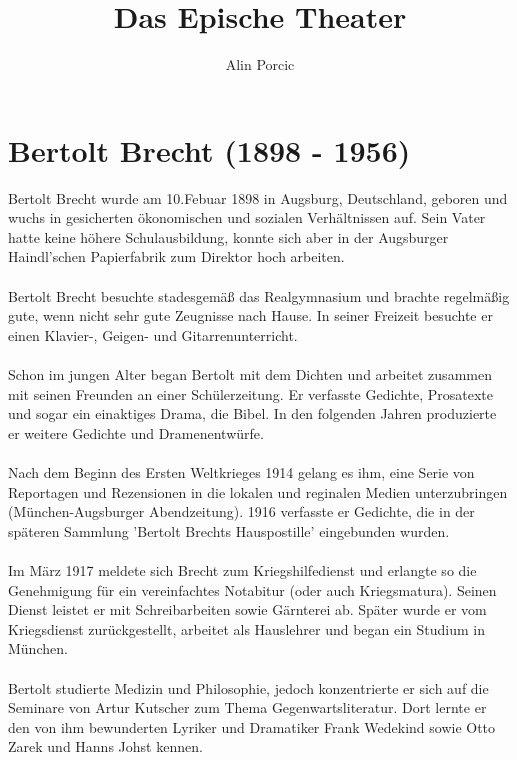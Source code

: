 \documentclass[a4paper]{article}
\title{Das Epische Theater}
\author{Alin Porcic}
\begin{document}
	\maketitle
	\newpage

        \section{Bertolt Brecht (1898 - 1956)}

	Bertolt Brecht wurde am 10.Febuar 1898 in Augsburg, Deutschland, geboren und wuchs in gesicherten ökonomischen und sozialen Verhältnissen auf. Sein Vater hatte keine höhere Schulausbildung, konnte sich aber in der Augsburger Haindl'schen Papierfabrik zum Direktor hoch arbeiten.\\\\
        Bertolt Brecht besuchte stadesgemäß das Realgymnasium und brachte regelmäßig gute, wenn nicht sehr gute Zeugnisse nach Hause. In seiner Freizeit besuchte er einen Klavier-, Geigen- und Gitarrenunterricht.\\\\
        Schon im jungen Alter began Bertolt mit dem Dichten und arbeitet zusammen mit seinen Freunden an einer Schülerzeitung. Er verfasste Gedichte, Prosatexte und sogar ein einaktiges Drama, die Bibel. In den folgenden Jahren produzierte er weitere Gedichte und Dramenentwürfe.\\\\
        Nach dem Beginn des Ersten Weltkrieges 1914 gelang es ihm, eine Serie von Reportagen und Rezensionen in die lokalen und reginalen Medien unterzubringen (München-Augsburger Abendzeitung). 1916 verfasste er Gedichte, die in der späteren Sammlung 'Bertolt Brechts Hauspostille' eingebunden wurden.\\\\
        Im März 1917 meldete sich Brecht zum Kriegshilfedienst und erlangte so die Genehmigung für ein vereinfachtes Notabitur (oder auch Kriegsmatura). Seinen Dienst leistet er mit Schreibarbeiten sowie Gärnterei ab. Später wurde er vom Kriegsdienst zurückgestellt, arbeitet als Hauslehrer und began ein Studium in München.\\\\
        Bertolt studierte Medizin und Philosophie, jedoch konzentrierte er sich auf die Seminare von Artur Kutscher zum Thema Gegenwartsliteratur. Dort lernte er den von ihm bewunderten Lyriker und Dramatiker Frank Wedekind sowie Otto Zarek und Hanns Johst kennen.\\\\
\end{document}
